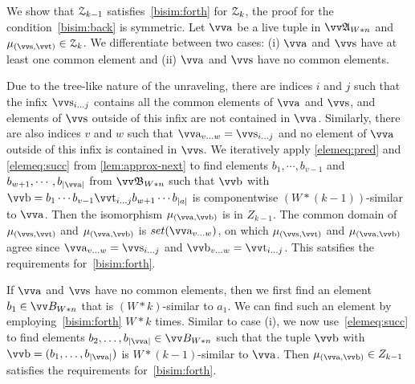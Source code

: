 \begin{proofsketch}
  We show that $\mathcal{Z}_{k-1}$ satisfies~\ref{bisim:forth} for $\mathcal{Z}_{k}$, the proof for the condition~\ref{bisim:back} is symmetric.
  Let $\elemtuptuplea$ be a live tuple in $\unravel{A}_{W * n}$ and $\mu_{(\elemtuptuples, \elemtuptuplet)} \in \bisimZ_{k}$.
  We differentiate between two cases: (i) $\elemtuptuplea$ and $\elemtuptuples$ have at least one common element and (ii) $\elemtuptuplea$ and $\elemtuptuples$ have no common elements.
  \begin{romanenumerate}
    \item
    Due to the tree-like nature of the unraveling, there are indices $i$ and $j$ such that the infix $\elemtuptuples_{i\ldots{}j}$ contains all the common elements of $\elemtuptuplea$ and $\elemtuptuples$, and elements of $\elemtuptuples$ outside of this infix are not contained in $\elemtuptuplea$.
    Similarly, there are also indices $v$ and $w$ such that $\elemtuptuplea_{v\ldots{}w} = \elemtuptuples_{i\ldots{}j}$ and no element of $\elemtuptuplea$ outside of this infix is contained in $\elemtuptuples$.
    We iteratively apply \ref{elemeq:pred} and \ref{elemeq:succ} from \cref{lem:approx-next} to find elements $b_{1}, \cdots, b_{v-1}$ and $b_{w+1}, \cdots, b_{|\elemtuptuplea|}$ from $\unravel{B}_{W * n}$ such that $\elemtuptupleb$ with $\elemtuptupleb = b_{1}\cdots{}b_{v-1}\elemtuptuplet_{i\ldots{}j}b_{w+1}\cdots{}b_{|a|}$ is componentwise $(W*(k-1))$-similar to $\elemtuptuplea$.
    Then the isomorphism $\mu_{(\elemtuptuplea,\elemtuptupleb)}$ is in $Z_{k-1}$.
    The common domain of $\mu_{(\elemtuptuples,\elemtuptuplet)}$ and $\mu_{(\elemtuptuplea,\elemtuptupleb)}$ is $\set(\elemtuptuplea_{v\ldots{}w})$, on which $\mu_{(\elemtuptuples,\elemtuptuplet)}$ and $\mu_{(\elemtuptuplea,\elemtuptupleb)}$ agree since $\elemtuptuplea_{v\ldots{}w} = \elemtuptuples_{i\ldots{}j}$ and $\elemtuptupleb_{v\ldots{}w} = \elemtuptuplet_{i\ldots{}j}$.
    This satsifies the requirements for~\ref{bisim:forth}.

    \item
    If $\elemtuptuplea$ and $\elemtuptuples$ have no common elements, then we first find an element $b_{1} \in \unraveldom{B}_{W * n}$ that is $(W * k)$-similar to $a_{1}$.
    We can find such an element by employing~\ref{bisim:forth} $W * k$ times.
    Similar to case (i), we now use~\ref{elemeq:succ} to find elements $b_{2}, \ldots, b_{|\elemtuptuplea|} \in \unraveldom{B}_{W * n}$ such that the tuple $\elemtuptupleb$ with $\elemtuptupleb = (b_{1}, \ldots, b_{|\elemtuptuplea|})$ is $W * (k - 1)$-similar to $\elemtuptuplea$.
    Then $\mu_{(\elemtuptuplea, \elemtuptupleb)} \in Z_{k-1}$ satisfies the requirements for~\ref{bisim:forth}.
  \end{romanenumerate}
\end{proofsketch}
